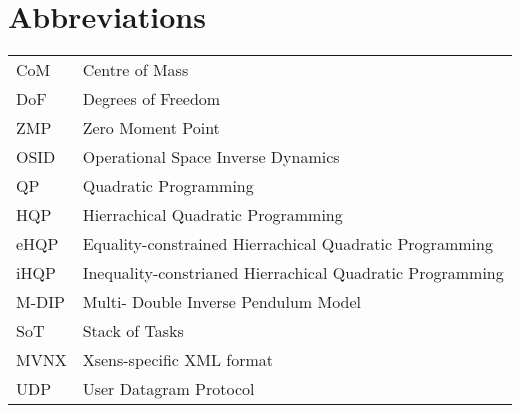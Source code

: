 \documentclass{thesisreport}
\begin{document}
\newpage

\section*{Abbreviations}

\begin{tabular}{p{3cm}p{15cm}}
CoM & Centre of Mass \\
DoF & Degrees of Freedom \\
ZMP & Zero Moment Point \\
OSID & Operational Space Inverse Dynamics \\
QP & Quadratic Programming \\
HQP & Hierrachical Quadratic Programming \\
eHQP & Equality-constrained Hierrachical Quadratic Programming \\
iHQP & Inequality-constrianed Hierrachical Quadratic Programming \\
M-DIP & Multi- Double Inverse Pendulum Model \\
SoT & Stack of Tasks \\
MVNX & Xsens-specific XML format \\
UDP & User Datagram Protocol \\



\end{tabular}

 \newpage
 
 \tableofcontents

 \listoffigures
 
\listoftables
 



\leavevmode\thispagestyle{empty}\newpage



\leavevmode\thispagestyle{empty}\newpage


\leavevmode\thispagestyle{empty}\newpage


\leavevmode\thispagestyle{empty}\newpage


\leavevmode\thispagestyle{empty}\newpage


\leavevmode\thispagestyle{empty}\newpage


 
 
 
 \appendix	
 
 
 
 
 
 
 
 
\end{document}
